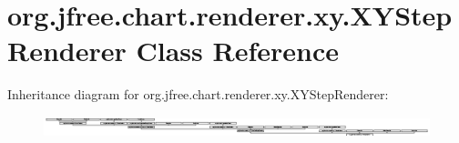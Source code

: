 \hypertarget{classorg_1_1jfree_1_1chart_1_1renderer_1_1xy_1_1_x_y_step_renderer}{}\section{org.\+jfree.\+chart.\+renderer.\+xy.\+X\+Y\+Step\+Renderer Class Reference}
\label{classorg_1_1jfree_1_1chart_1_1renderer_1_1xy_1_1_x_y_step_renderer}
Inheritance diagram for org.\+jfree.\+chart.\+renderer.\+xy.\+X\+Y\+Step\+Renderer\+:\begin{figure}[H]
\begin{center}
\leavevmode
\includegraphics[height=0.604230cm]{classorg_1_1jfree_1_1chart_1_1renderer_1_1xy_1_1_x_y_step_renderer}
\end{center}
\end{figure}
